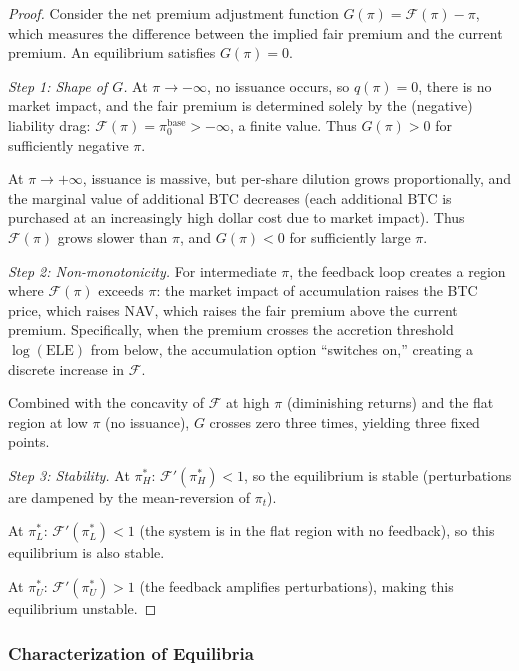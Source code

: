 \begin{proof}
Consider the net premium adjustment function
$G(\pi) = \mathcal{F}(\pi) - \pi$, which measures the difference between
the implied fair premium and the current premium.  An equilibrium satisfies
$G(\pi) = 0$.

\emph{Step 1: Shape of $G$.}
At $\pi \to -\infty$, no issuance occurs, so $q(\pi) = 0$, there is no
market impact, and the fair premium is determined solely by the (negative)
liability drag: $\mathcal{F}(\pi) = \pi_0^{\mathrm{base}} > -\infty$, a
finite value.  Thus $G(\pi) > 0$ for sufficiently negative $\pi$.

At $\pi \to +\infty$, issuance is massive, but per-share dilution grows
proportionally, and the marginal value of additional BTC decreases (each
additional BTC is purchased at an increasingly high dollar cost due to
market impact).  Thus $\mathcal{F}(\pi)$ grows slower than $\pi$, and
$G(\pi) < 0$ for sufficiently large $\pi$.

\emph{Step 2: Non-monotonicity.}
For intermediate $\pi$, the feedback loop creates a region where
$\mathcal{F}(\pi)$ exceeds $\pi$: the market impact of accumulation raises
the BTC price, which raises NAV, which raises the fair premium above the
current premium.  Specifically, when the premium crosses the accretion
threshold $\log(\mathrm{ELE})$ from below, the accumulation option
``switches on,'' creating a discrete increase in $\mathcal{F}$.

Combined with the concavity of $\mathcal{F}$ at high $\pi$ (diminishing
returns) and the flat region at low $\pi$ (no issuance), $G$ crosses zero
three times, yielding three fixed points.

\emph{Step 3: Stability.}
At $\pi_H^*$: $\mathcal{F}'(\pi_H^*) < 1$, so the equilibrium is stable
(perturbations are dampened by the mean-reversion of $\pi_t$).

At $\pi_L^*$: $\mathcal{F}'(\pi_L^*) < 1$ (the system is in the flat
region with no feedback), so this equilibrium is also stable.

At $\pi_U^*$: $\mathcal{F}'(\pi_U^*) > 1$ (the feedback amplifies
perturbations), making this equilibrium unstable.
\end{proof}

\subsubsection{Characterization of Equilibria}

